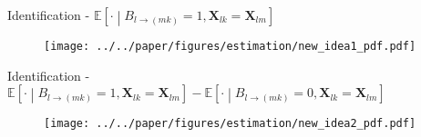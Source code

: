\documentclass[aspectratio=169,10pt,hyperref={colorlinks,linkcolor={red!50!black},citecolor={blue!90!black},urlcolor={blue!80!black}},usenames,dvipsnames]{beamer}
\begin{document}
\begin{frame}{Identification - $\mathbb{E}\left[\cdot\middle \vert B_{l \rightarrow (mk)} = 1,\boldsymbol{X}_{lk} = \boldsymbol{X}_{lm} \right]$}
  \vspace{-15pt}
  \begin{figure}[H]
    \centering
      \texttt{[image: ../../paper/figures/estimation/new\_idea1\_pdf.pdf]}
 \end{figure} 
\end{frame}

\begin{frame}{Identification - $\mathbb{E}\left[\cdot \middle \vert B_{l \rightarrow (mk)} = 1,\boldsymbol{X}_{lk} = \boldsymbol{X}_{lm} \right] - 
  \mathbb{E}\left[\cdot \middle \vert B_{l \rightarrow (mk)} = 0,\boldsymbol{X}_{lk} = \boldsymbol{X}_{lm} \right]$}  
  \vspace{-15pt}
  \begin{figure}[H]
    \centering
      \texttt{[image: ../../paper/figures/estimation/new\_idea2\_pdf.pdf]}
 \end{figure} 
\end{frame}
\end{document}
